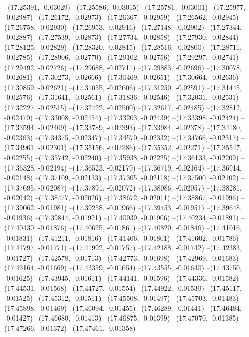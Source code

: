 --(17.25391, -0.03029)
--(17.25586, -0.03015)
--(17.25781, -0.03001)
--(17.25977, -0.02987)
--(17.26172, -0.02973)
--(17.26367, -0.02959)
--(17.26562, -0.02945)
--(17.26758, -0.02930)
--(17.26953, -0.02916)
--(17.27148, -0.02902)
--(17.27344, -0.02887)
--(17.27539, -0.02873)
--(17.27734, -0.02858)
--(17.27930, -0.02844)
--(17.28125, -0.02829)
--(17.28320, -0.02815)
--(17.28516, -0.02800)
--(17.28711, -0.02785)
--(17.28906, -0.02770)
--(17.29102, -0.02756)
--(17.29297, -0.02741)
--(17.29492, -0.02726)
--(17.29688, -0.02711)
--(17.29883, -0.02696)
--(17.30078, -0.02681)
--(17.30273, -0.02666)
--(17.30469, -0.02651)
--(17.30664, -0.02636)
--(17.30859, -0.02621)
--(17.31055, -0.02606)
--(17.31250, -0.02591)
--(17.31445, -0.02576)
--(17.31641, -0.02561)
--(17.31836, -0.02546)
--(17.32031, -0.02531)
--(17.32227, -0.02515)
--(17.32422, -0.02500)
--(17.32617, -0.02485)
--(17.32812, -0.02470)
--(17.33008, -0.02454)
--(17.33203, -0.02439)
--(17.33398, -0.02424)
--(17.33594, -0.02409)
--(17.33789, -0.02393)
--(17.33984, -0.02378)
--(17.34180, -0.02363)
--(17.34375, -0.02347)
--(17.34570, -0.02332)
--(17.34766, -0.02317)
--(17.34961, -0.02301)
--(17.35156, -0.02286)
--(17.35352, -0.02271)
--(17.35547, -0.02255)
--(17.35742, -0.02240)
--(17.35938, -0.02225)
--(17.36133, -0.02209)
--(17.36328, -0.02194)
--(17.36523, -0.02179)
--(17.36719, -0.02164)
--(17.36914, -0.02148)
--(17.37109, -0.02133)
--(17.37305, -0.02118)
--(17.37500, -0.02102)
--(17.37695, -0.02087)
--(17.37891, -0.02072)
--(17.38086, -0.02057)
--(17.38281, -0.02042)
--(17.38477, -0.02026)
--(17.38672, -0.02011)
--(17.38867, -0.01996)
--(17.39062, -0.01981)
--(17.39258, -0.01966)
--(17.39453, -0.01951)
--(17.39648, -0.01936)
--(17.39844, -0.01921)
--(17.40039, -0.01906)
--(17.40234, -0.01891)
--(17.40430, -0.01876)
--(17.40625, -0.01861)
--(17.40820, -0.01846)
--(17.41016, -0.01831)
--(17.41211, -0.01816)
--(17.41406, -0.01801)
--(17.41602, -0.01786)
--(17.41797, -0.01771)
--(17.41992, -0.01757)
--(17.42188, -0.01742)
--(17.42383, -0.01727)
--(17.42578, -0.01713)
--(17.42773, -0.01698)
--(17.42969, -0.01683)
--(17.43164, -0.01669)
--(17.43359, -0.01654)
--(17.43555, -0.01640)
--(17.43750, -0.01625)
--(17.43945, -0.01611)
--(17.44141, -0.01596)
--(17.44336, -0.01582)
--(17.44531, -0.01568)
--(17.44727, -0.01554)
--(17.44922, -0.01539)
--(17.45117, -0.01525)
--(17.45312, -0.01511)
--(17.45508, -0.01497)
--(17.45703, -0.01483)
--(17.45898, -0.01469)
--(17.46094, -0.01455)
--(17.46289, -0.01441)
--(17.46484, -0.01427)
--(17.46680, -0.01413)
--(17.46875, -0.01399)
--(17.47070, -0.01385)
--(17.47266, -0.01372)
--(17.47461, -0.01358)
